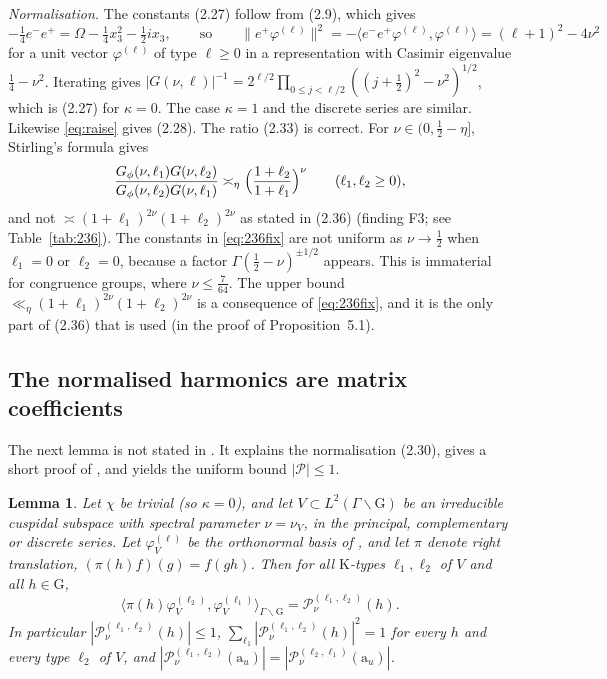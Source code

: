 \documentclass[11pt]{amsart}
\newtheorem{lemma}[theorem]{Lemma}
\theoremstyle{remark}
\theoremstyle{definition}
\numberwithin{equation}{section}
\newcommand{\G}{\mathrm{G}}
\newcommand{\K}{\mathrm{K}}
\newcommand{\br}[1]{\langle #1\rangle}
\newcommand{\Pc}{\mathcal{P}}
\newcommand{\ra}{\mathrm{a}}
\begin{document}
\emph{Normalisation.} The constants (2.27) follow from (2.9), which gives
\[
-\tfrac14e^-e^+=\Omega-\tfrac14x_3^2-\tfrac12ix_3,\qquad\text{so}\qquad \|e^+\varphi^{(\ell)}\|^2=-\br{e^-e^+\varphi^{(\ell)},\varphi^{(\ell)}}=(\ell+1)^2-4\nu^2
\]
for a unit vector $\varphi^{(\ell)}$ of type $\ell\ge0$ in a representation with Casimir eigenvalue $\frac14-\nu^2$. Iterating gives $|G(\nu,\ell)|^{-1}=2^{\ell/2}\prod_{0\le j<\ell/2}((j+\frac12)^2-\nu^2)^{1/2}$, which is (2.27) for $\kappa=0$. The case $\kappa=1$ and the discrete series are similar. Likewise \eqref{eq:raise} gives (2.28). The ratio (2.33) is correct. For $\nu\in(0,\frac12-\eta]$, Stirling's formula gives
\begin{equation}\label{eq:236fix}
\frac{G_\phi(\nu,\ell_1)G(\nu,\ell_2)}{G_\phi(\nu,\ell_2)G(\nu,\ell_1)}\asymp_\eta\Bigl(\frac{1+\ell_2}{1+\ell_1}\Bigr)^{\nu}\qquad(\ell_1,\ell_2\ge0),
\end{equation}
and not $\asymp(1+\ell_1)^{2\nu}(1+\ell_2)^{2\nu}$ as stated in (2.36) (finding F3; see Table~\ref{tab:236}). The constants in \eqref{eq:236fix} are not uniform as $\nu\to\frac12$ when $\ell_1=0$ or $\ell_2=0$, because a factor $\Gamma(\frac12-\nu)^{\pm1/2}$ appears. This is immaterial for congruence groups, where $\nu\le\frac7{64}$. The upper bound $\ll_\eta(1+\ell_1)^{2\nu}(1+\ell_2)^{2\nu}$ is a consequence of \eqref{eq:236fix}, and it is the only part of (2.36) that is used (in the proof of Proposition~5.1).

\subsection{The normalised harmonics are matrix coefficients}\label{sec:matrix}
The next lemma is not stated in \cite{GM1}. It explains the normalisation (2.30), gives a short proof of \cite[Proposition~3.2]{GM1}, and yields the uniform bound $|\Pc|\le1$.

\begin{lemma}\label{lem:matrixcoeff}
Let $\chi$ be trivial (so $\kappa=0$), and let $V\subset L^2(\Gamma\backslash\G)$ be an irreducible cuspidal subspace with spectral parameter $\nu=\nu_V$, in the principal, complementary or discrete series. Let $\varphi_V^{(\ell)}$ be the orthonormal basis of \cite[(2.27)]{GM1}, and let $\pi$ denote right translation, $(\pi(h)f)(g)=f(gh)$. Then for all $\K$-types $\ell_1,\ell_2$ of $V$ and all $h\in\G$,
\[
\br{\pi(h)\varphi_V^{(\ell_2)},\varphi_V^{(\ell_1)}}_{\Gamma\backslash\G}=\Pc^{(\ell_1,\ell_2)}_{\nu}(h).
\]
In particular $|\Pc^{(\ell_1,\ell_2)}_\nu(h)|\le1$, $\sum_{\ell_1}|\Pc^{(\ell_1,\ell_2)}_\nu(h)|^2=1$ for every $h$ and every type $\ell_2$ of $V$, and $|\Pc^{(\ell_1,\ell_2)}_\nu(\ra_u)|=|\Pc^{(\ell_2,\ell_1)}_\nu(\ra_u)|$.
\end{lemma}
\end{document}
